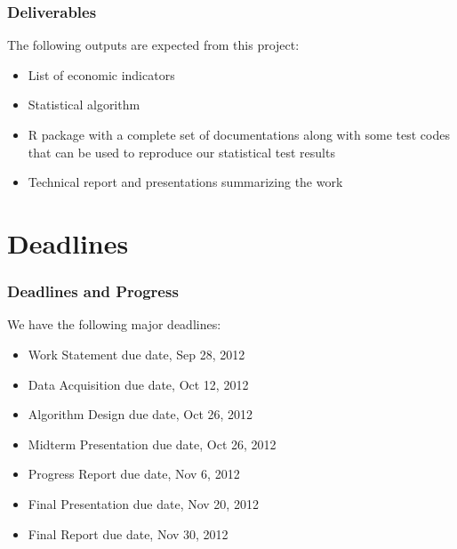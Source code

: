\documentclass[compress,handout,10pt]{beamer}
\let\olditem\item
\renewcommand{\item}{\setlength{\itemsep}{0.5\baselineskip}\olditem}
\begin{document}
\begin{frame}
\frametitle{Deliverables} 
The following outputs are expected from this project:
\begin{itemize}
    \item List of economic indicators 
    \item Statistical algorithm 
    \item R package with a complete set of documentations along with some test codes that can be used to reproduce our statistical test results
    \item Technical report and presentations summarizing the work
\end{itemize}

\end{frame}



\section{Deadlines}
\begin{frame}
    \frametitle{Deadlines and Progress}

We have the following major deadlines:
\begin{itemize}
    \item Work Statement due date, Sep 28, 2012
    \item Data Acquisition due date, Oct 12, 2012
    \item Algorithm Design due date, Oct 26, 2012
    \item Midterm Presentation due date, Oct 26, 2012
    \item Progress Report due date, Nov 6, 2012
    \item Final Presentation due date, Nov 20, 2012
    \item Final Report due date, Nov 30, 2012
\end{itemize}

\end{frame}


\end{document}
